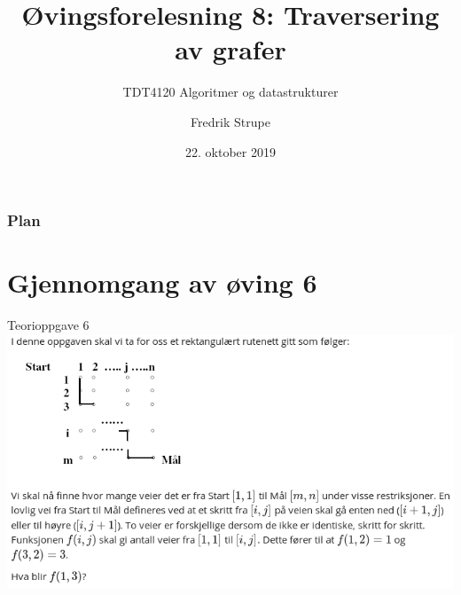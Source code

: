 \documentclass[14pt]{beamer}
\title{Øvingsforelesning 8: Traversering av grafer}
\subtitle{TDT4120 Algoritmer og datastrukturer}
\date{22. oktober 2019}
\author{Fredrik Strupe}
\institute{NTNU}
\begin{document}
\maketitle
\begin{frame}
    \frametitle{Plan}
    \tableofcontents
\end{frame}

\section{Gjennomgang av øving 6}
\begin{frame}{Teorioppgave 6}
    \includegraphics[width=\textwidth]{06t_q6.png}
\end{frame}
\end{document}
